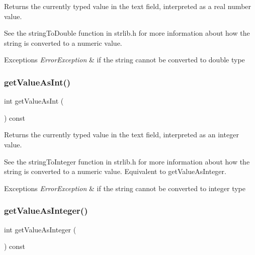 Returns the currently typed value in the text field, interpreted as a real number value. 

See the string\+To\+Double function in strlib.\+h for more information about how the string is converted to a numeric value. 
\begin{DoxyExceptions}{Exceptions}
{\em Error\+Exception} & if the string cannot be converted to double type \\
\hline
\end{DoxyExceptions}
\mbox{\label{classGTextField_a5e50caa202955b726a44a1dfbc6f7818}} 
\subsubsection{\texorpdfstring{get\+Value\+As\+Int()}{getValueAsInt()}}
{\footnotesize\ttfamily int get\+Value\+As\+Int (\begin{DoxyParamCaption}{ }\end{DoxyParamCaption}) const\hspace{0.3cm}{\ttfamily [virtual]}}



Returns the currently typed value in the text field, interpreted as an integer value. 

See the string\+To\+Integer function in strlib.\+h for more information about how the string is converted to a numeric value. Equivalent to get\+Value\+As\+Integer. 
\begin{DoxyExceptions}{Exceptions}
{\em Error\+Exception} & if the string cannot be converted to integer type \\
\hline
\end{DoxyExceptions}
\mbox{\label{classGTextField_a1cbf643145c03ed4c238d085fc88cf33}} 
\subsubsection{\texorpdfstring{get\+Value\+As\+Integer()}{getValueAsInteger()}}
{\footnotesize\ttfamily int get\+Value\+As\+Integer (\begin{DoxyParamCaption}{ }\end{DoxyParamCaption}) const\hspace{0.3cm}{\ttfamily [virtual]}}



